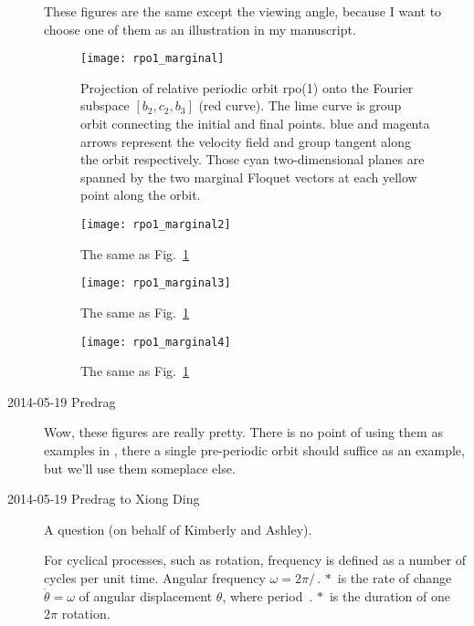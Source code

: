 \begin{description}
These figures are the same except the viewing angle, because I want to
choose one of them as an illustration in my manuscript.

\begin{figure}[h]
  \centering
  \texttt{[image: rpo1\_marginal]}
  \caption{Projection of relative periodic orbit rpo(1) onto the Fourier
    subspace $[b_2,c_2,b_3]$ (red curve). The lime curve is group orbit
    connecting the initial and final points. blue and magenta arrows
    represent the velocity field and group tangent along the orbit
    respectively. Those cyan two-dimensional planes are spanned by the
    two marginal Floquet vectors at each yellow point along the orbit.
  }
  \label{fig:rpo1_marginal}
\end{figure}

\begin{figure}[h]
  \centering
  \texttt{[image: rpo1\_marginal2]}
  \caption{ The same as Fig.~\ref{fig:rpo1_marginal}
  }
  \label{fig:rpo1_marginal2}
\end{figure}

\begin{figure}[h]
  \centering
  \texttt{[image: rpo1\_marginal3]}
  \caption{ The same as Fig.~\ref{fig:rpo1_marginal}
  }
  \label{fig:rpo1_marginal3}
\end{figure}

\begin{figure}[h]
  \centering
  \texttt{[image: rpo1\_marginal4]}
  \caption{ The same as Fig.~\ref{fig:rpo1_marginal}
  }
  \label{fig:rpo1_marginal4}
\end{figure}

\item[2014-05-19 Predrag] Wow, these figures are really pretty. There is no
point of using them as examples in , there a single
pre-periodic orbit should suffice as an example, but we'll use them
someplace else.

\item[2014-05-19 Predrag  to Xiong Ding]                   \toCB
A question (on behalf of Kimberly and Ashley).

For cyclical processes, such as rotation, frequency is defined as a
number of cycles per unit time. Angular frequency $\omega =
2\pi/\period{*}$ is the rate of change $\dot{\theta} = \omega$ of angular
displacement $\theta$, where period $\period{*}$ is the duration of one
$2\pi$ rotation.


\end{description}
